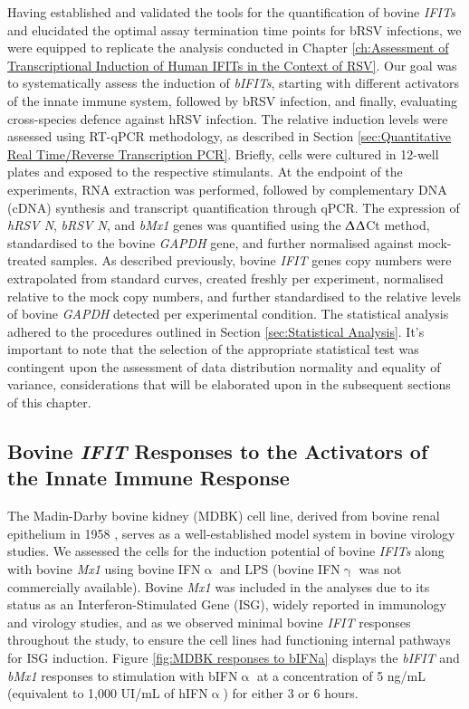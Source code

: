 Having established and validated the tools for the quantification of bovine \textit{IFITs} and elucidated the optimal assay termination time points for bRSV infections, we were equipped to replicate the analysis conducted in Chapter \ref{ch:Assessment of Transcriptional Induction of Human IFITs in the Context of RSV}. Our goal was to systematically assess the induction of \textit{bIFITs}, starting with different activators of the innate immune system, followed by bRSV infection, and finally, evaluating cross-species defence against hRSV infection. The relative induction levels were assessed using RT-qPCR methodology, as described in Section \ref{sec:Quantitative Real Time/Reverse Transcription PCR}. Briefly, cells were cultured in 12-well plates and exposed to the respective stimulants. At the endpoint of the experiments, RNA extraction was performed, followed by complementary DNA (cDNA) synthesis and transcript quantification through qPCR. The expression of \textit{hRSV N}, \textit{bRSV N}, and \textit{bMx1} genes was quantified using the $\Updelta$$\Updelta$Ct method, standardised to the bovine \textit{GAPDH} gene, and further normalised against mock-treated samples. As described previously, bovine \textit{IFIT} genes copy numbers were extrapolated from standard curves, created freshly per experiment, normalised relative to the mock copy numbers, and further standardised to the relative levels of bovine \textit{GAPDH} detected per experimental condition. The statistical analysis adhered to the procedures outlined in Section \ref{sec:Statistical Analysis}. It's important to note that the selection of the appropriate statistical test was contingent upon the assessment of data distribution normality and equality of variance, considerations that will be elaborated upon in the subsequent sections of this chapter.

\subsection{Bovine \textit{IFIT} Responses to the Activators of the Innate Immune Response} \label{subsec:Bovine IFIT Responses to Activators of Innate Immune Response}
The Madin-Darby bovine kidney (MDBK) cell line, derived from bovine renal epithelium in 1958 \cite{Madin1958EstablishedOrigin.}, serves as a well-established model system in bovine virology studies. We assessed the cells for the induction potential of bovine \textit{IFITs} along with bovine \textit{Mx1} using bovine IFN$\upalpha$ and LPS (bovine IFN$\upgamma$ was not commercially available). Bovine \textit{Mx1} was included in the analyses due to its status as an Interferon-Stimulated Gene (ISG), widely reported in immunology and virology studies, and as we observed minimal bovine \textit{IFIT} responses throughout the study, to ensure the cell lines had functioning internal pathways for ISG induction. Figure \ref{fig:MDBK responses to bIFNa} displays the \textit{bIFIT} and \textit{bMx1} responses to stimulation with bIFN$\upalpha$ at a concentration of 5 ng/mL (equivalent to 1,000 UI/mL of hIFN$\upalpha$) for either 3 or 6 hours.

